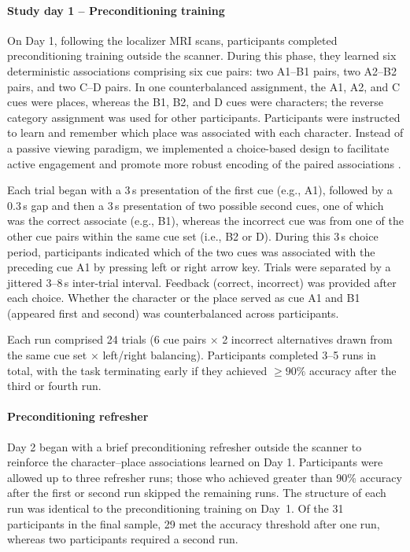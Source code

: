 \documentclass[9pt,twoside,lineno]{pnas-new}
\begin{document}
\paragraph*{Study day 1 – Preconditioning training}

On Day 1, following the localizer MRI scans, participants completed preconditioning training outside the scanner. During this phase, they learned six deterministic associations comprising six cue pairs: two A1–B1 pairs, two A2–B2 pairs, and two C–D pairs. In one counterbalanced assignment, the A1, A2, and C cues were places, whereas the B1, B2, and D cues were characters; the reverse category assignment was used for other participants. Participants were instructed to learn and remember which place was associated with each character. Instead of a passive viewing paradigm, we implemented a choice-based design to facilitate active engagement and promote more robust encoding of the paired associations \cite{bunsey1996conservation}.

Each trial began with a 3\,s presentation of the first cue (e.g., A1), followed by a 0.3\,s gap and then a 3\,s presentation of two possible second cues, one of which was the correct associate (e.g., B1), whereas the incorrect cue was from one of the other cue pairs within the same cue set (i.e., B2 or D). During this 3\,s choice period, participants indicated which of the two cues was associated with the preceding cue A1 by pressing left or right arrow key. Trials were separated by a jittered 3–8\,s inter-trial interval. Feedback (correct, incorrect) was provided after each choice. Whether the character or the place served as cue A1 and B1 (appeared first and second) was counterbalanced across participants.

Each run comprised 24 trials (6 cue pairs $\times$ 2 incorrect alternatives drawn from the same cue set $\times$ left/right balancing). Participants completed 3--5 runs in total, with the task terminating early if they achieved $\geq 90\%$ accuracy after the third or fourth run.

\paragraph*{Preconditioning refresher}

Day 2 began with a brief preconditioning refresher outside the scanner to reinforce the character–place associations learned on Day 1. Participants were allowed up to three refresher runs; those who achieved greater than 90\% accuracy after the first or second run skipped the remaining runs. The structure of each run was identical to the preconditioning training on Day~1. Of the 31 participants in the final sample, 29 met the accuracy threshold after one run, whereas two participants required a second run.
\end{document}
